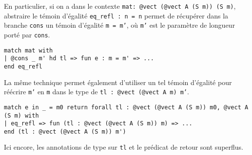 \documentclass{article}
\begin{document}
En particulier, si on a dans le contexte \texttt{mat: @vect (@vect A (S m)) (S m)}, abstraire le témoin d'égalité \texttt{eq_refl : n = n} permet de récupérer dans la branche \texttt{cons} un témoin d'égalité \texttt{m = m'}, où \texttt{m'} est le paramètre de longueur porté par \texttt{cons}.
\begin{verbatim}
match mat with
| @cons _ m' hd tl => fun e : m = m' => ...
end eq_refl
\end{verbatim}

La même technique permet également d'utiliser un tel témoin d'égalité pour réécrire \texttt{m'} en \texttt{m} dans le type de \texttt{tl : @vect (@vect A m) m'}.

\begin{verbatim}
match e in _ = m0 return forall tl : @vect (@vect A (S m)) m0, @vect A (S m) with
| eq_refl => fun (tl : @vect (@vect A (S m)) m) => ...
end (tl : @vect (@vect A (S m)) m')
\end{verbatim}

Ici encore, les annotations de type sur \texttt{tl} et le prédicat de retour sont superflus.        
\end{document}
